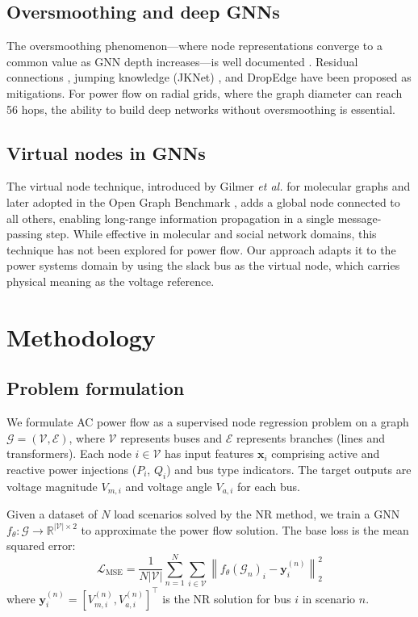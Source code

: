 \documentclass[preprint,review,12pt]{elsarticle}
\begin{document}
\subsection{Oversmoothing and deep GNNs}

The oversmoothing phenomenon---where node representations converge to a common value as GNN depth increases---is well documented \cite{b16}. Residual connections \cite{b17}, jumping knowledge (JKNet) \cite{b18}, and DropEdge \cite{b19} have been proposed as mitigations. For power flow on radial grids, where the graph diameter can reach 56 hops, the ability to build deep networks without oversmoothing is essential.

\subsection{Virtual nodes in GNNs}

The virtual node technique, introduced by Gilmer \emph{et al.} \cite{b20} for molecular graphs and later adopted in the Open Graph Benchmark \cite{b21}, adds a global node connected to all others, enabling long-range information propagation in a single message-passing step. While effective in molecular and social network domains, this technique has not been explored for power flow. Our approach adapts it to the power systems domain by using the slack bus as the virtual node, which carries physical meaning as the voltage reference.

\section{Methodology}
\label{sec:methodology}

\subsection{Problem formulation}

We formulate AC power flow as a supervised node regression problem on a graph $\mathcal{G} = (\mathcal{V}, \mathcal{E})$, where $\mathcal{V}$ represents buses and $\mathcal{E}$ represents branches (lines and transformers). Each node $i \in \mathcal{V}$ has input features $\mathbf{x}_i$ comprising active and reactive power injections ($P_i$, $Q_i$) and bus type indicators. The target outputs are voltage magnitude $V_{m,i}$ and voltage angle $V_{a,i}$ for each bus.

Given a dataset of $N$ load scenarios solved by the NR method, we train a GNN $f_\theta: \mathcal{G} \rightarrow \mathbb{R}^{|\mathcal{V}| \times 2}$ to approximate the power flow solution. The base loss is the mean squared error:
\begin{equation}
\mathcal{L}_{\text{MSE}} = \frac{1}{N|\mathcal{V}|} \sum_{n=1}^{N} \sum_{i \in \mathcal{V}} \left\| f_\theta(\mathcal{G}_n)_i - \mathbf{y}_i^{(n)} \right\|_2^2
\label{eq:mse}
\end{equation}
where $\mathbf{y}_i^{(n)} = [V_{m,i}^{(n)}, V_{a,i}^{(n)}]^\top$ is the NR solution for bus $i$ in scenario $n$.
\end{document}
